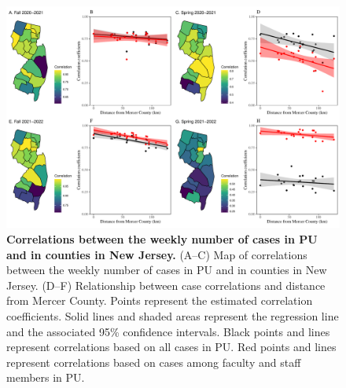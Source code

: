 \documentclass[12pt]{article}
\begin{document}
\begin{figure}[!htp]
\begin{center}
\includegraphics[width=\textwidth]{../figure_princeton_new/figure_princeton_map_new.pdf}
\end{center}
\caption{
\textbf{Correlations between the weekly number of cases in PU and in counties in New Jersey.}
(A--C) Map of correlations between the weekly number of cases in PU and in counties in New Jersey.
(D--F) Relationship between case correlations and distance from Mercer County.
Points represent the estimated correlation coefficients.
Solid lines and shaded areas represent the regression line and the associated 95\% confidence intervals.
Black points and lines represent correlations based on all cases in PU.
Red points and lines represent correlations based on cases among faculty and staff members in PU.
}
\end{figure}


\pagebreak
\end{document}
